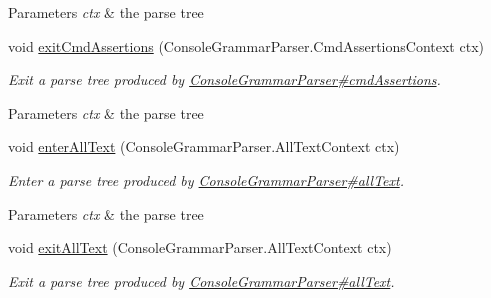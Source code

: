 \begin{DoxyCompactItemize}
\begin{DoxyCompactList}
\begin{DoxyParams}{Parameters}
{\em ctx} & the parse tree\\
\hline
\end{DoxyParams}
 \end{DoxyCompactList}\item 
void \hyperlink{classgov_1_1nasa_1_1jpf_1_1inspector_1_1client_1_1parser_1_1_console_grammar_base_listener_a0d9c7ffb46f2235a4188465e262f7b96}{exit\+Cmd\+Assertions} (Console\+Grammar\+Parser.\+Cmd\+Assertions\+Context ctx)
\begin{DoxyCompactList}\small\item\em Exit a parse tree produced by \hyperlink{classgov_1_1nasa_1_1jpf_1_1inspector_1_1client_1_1parser_1_1_console_grammar_parser_aad29008053f0b40d17bf6e3e929b9b11}{Console\+Grammar\+Parser\#cmd\+Assertions}.


\begin{DoxyParams}{Parameters}
{\em ctx} & the parse tree\\
\hline
\end{DoxyParams}
 \end{DoxyCompactList}\item 
void \hyperlink{classgov_1_1nasa_1_1jpf_1_1inspector_1_1client_1_1parser_1_1_console_grammar_base_listener_a4ef022dad87d6245769821bdfa992de0}{enter\+All\+Text} (Console\+Grammar\+Parser.\+All\+Text\+Context ctx)
\begin{DoxyCompactList}\small\item\em Enter a parse tree produced by \hyperlink{classgov_1_1nasa_1_1jpf_1_1inspector_1_1client_1_1parser_1_1_console_grammar_parser_a9dfaeb28734c8b3f7ec5a7b81ed7d42e}{Console\+Grammar\+Parser\#all\+Text}.


\begin{DoxyParams}{Parameters}
{\em ctx} & the parse tree\\
\hline
\end{DoxyParams}
 \end{DoxyCompactList}\item 
void \hyperlink{classgov_1_1nasa_1_1jpf_1_1inspector_1_1client_1_1parser_1_1_console_grammar_base_listener_ac3f5649545860c2c204b4b44809ff836}{exit\+All\+Text} (Console\+Grammar\+Parser.\+All\+Text\+Context ctx)
\begin{DoxyCompactList}\small\item\em Exit a parse tree produced by \hyperlink{classgov_1_1nasa_1_1jpf_1_1inspector_1_1client_1_1parser_1_1_console_grammar_parser_a9dfaeb28734c8b3f7ec5a7b81ed7d42e}{Console\+Grammar\+Parser\#all\+Text}.



\end{DoxyCompactList}
\end{DoxyCompactItemize}

